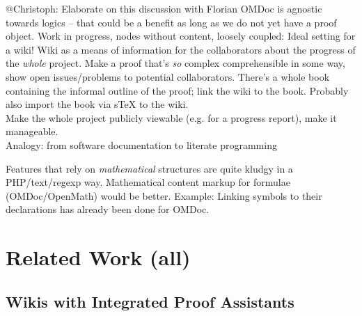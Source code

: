 \documentclass{llncs}
\begin{document}
\begin{todo}{@Christoph: Elaborate on this discussion with Florian}
  OMDoc is agnostic towards logics -- that could be a benefit as long as we do not yet
  have a proof object. Work in progress, nodes without content, loosely coupled: Ideal
  setting for a wiki!  Wiki as a means of information for the collaborators about the
  progress of the \emph{whole} project.  Make a proof that's \emph{so} complex
  comprehensible in some way, show open issues/problems to potential collaborators.
  There's a whole book containing the informal outline of the proof; link the wiki to the
  book.  Probably also import the book via sTeX to the wiki.\\
  Make the whole project publicly viewable (e.g. for a progress report), make it
  manageable.\\
  Analogy: from software documentation to literate programming
\end{todo}

Features that rely on \emph{mathematical} structures are quite kludgy in a PHP/text/regexp
way.  Mathematical content markup for formulae (OMDoc/OpenMath) would be better.  Example:
Linking symbols to their declarations has already been done for OMDoc.




\section{Related Work (all)}
\label{sec:related}


\subsection{Wikis with Integrated Proof Assistants}
\label{sec:wiki-pa}
\end{document}

